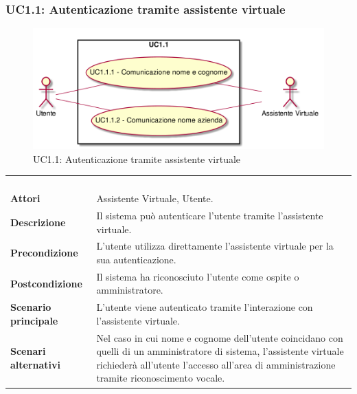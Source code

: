 \newpage\subsubsection{UC1.1: Autenticazione tramite assistente virtuale}
\label{UC1.1}
\begin{figure}[h]
	\centering
	\includegraphics[width=\textwidth,height=\textheight,keepaspectratio]{images/UseCaseUC11.png}
	\caption{UC1.1: Autenticazione tramite assistente virtuale}
\end{figure}
\begin{longtable}{l|p{10cm}}
	\rowcolor[gray]{0.8} \multicolumn{2}{c}{} \\
	\rowcolor[gray]{0.8} \multicolumn{2}{c}{\textbf{UC1.1 - Autenticazione tramite assistente virtuale}} \\
	\rowcolor[gray]{0.8} \multicolumn{2}{c}{} \\
	\hline
	&\\
	\textbf{Attori} & Assistente Virtuale, Utente.\\[7pt]
	\textbf{Descrizione} & Il sistema può autenticare l'utente tramite l'assistente virtuale.\\[7pt]
	\textbf{Precondizione} & L'utente utilizza direttamente l'assistente virtuale per la sua autenticazione.\\[7pt]
	\textbf{Postcondizione} & Il sistema ha riconosciuto l'utente come ospite o amministratore.\\[7pt]
	\textbf{Scenario principale} &L'utente viene autenticato tramite l'interazione con l'assistente virtuale.\\[7pt]
	\textbf{Scenari alternativi} & Nel caso in cui nome e cognome dell'utente coincidano con quelli di un amministratore di sistema, l'assistente virtuale 
	richiederà all'utente l'accesso all'area di amministrazione tramite riconoscimento vocale.\\[7pt]\hline
\end{longtable}

